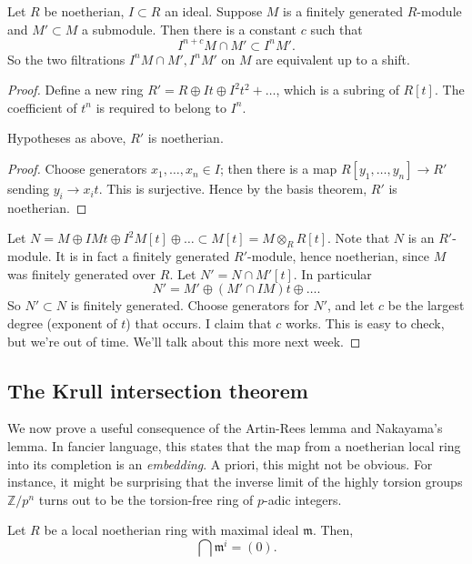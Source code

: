 \begin{theorem}
\label{artinrees}
Let $R$ be noetherian, $I \subset R$ an
ideal. Suppose $M$ is a finitely generated $R$-module and $M' \subset M$ a
submodule. Then
there is a  constant $c$ such that
\[ I^{n+c} M \cap M' \subset I^n M'.  \]
So the two filtrations $I^n M \cap M', I^n M'$ on $M$ are equivalent up to a
shift.
\end{theorem} 
\begin{proof} 
Define a new ring $R' = R \oplus It \oplus I^2 t^2 + \dots$, which is a subring
of
$R[t]$. The coefficient of $t^n $ is required to belong to $I^n$. 

\begin{lemma} 
Hypotheses as above, $R'$ is noetherian.
\end{lemma} 
\begin{proof} 
Choose generators $x_1, \dots, x_n \in I$; then there is a map $R[y_1, \dots,
y_n] \to R'$ sending $y_i \to x_i t$. This is surjective. Hence by the basis
theorem, $R'$ is noetherian.
\end{proof} 

Let $N = M \oplus  IM t \oplus I^2 M [t] \oplus \dots \subset M[t] = M
\otimes_R R[t]$. Note that $N$ is an $R'$-module. It is in fact a finitely
generated $R'$-module, hence noetherian, since $M$ was finitely generated over
$R$. Let $N' = N \cap M'[t]$. In particular
\[ N' = M' \oplus (M' \cap IM ) t \oplus \dots.  \]
So $N' \subset N$ is finitely generated. Choose generators for $N'$, and let
$c$ be the largest degree (exponent of $t$) that occurs.
I claim that $c$ works.  This is easy to check, but we're out of time. We'll
talk about this more next week. 
\end{proof} 


\subsection{The Krull intersection theorem}

We now prove a useful consequence of the Artin-Rees lemma and Nakayama's
lemma. In fancier language, this states that the map from a noetherian local
ring into its
completion is an \emph{embedding}. A priori, this might not be obvious. For
instance, it might be surprising that the inverse limit of the highly torsion
groups $\mathbb{Z}/p^n$ turns out to be the torsion-free ring of $p$-adic
integers.

\begin{theorem}[Krull] Let $R$ be a local noetherian ring with maximal ideal
$\mathfrak{m}$. Then,
\[ \bigcap \mathfrak{m}^i = (0).  \]
\end{theorem} 

